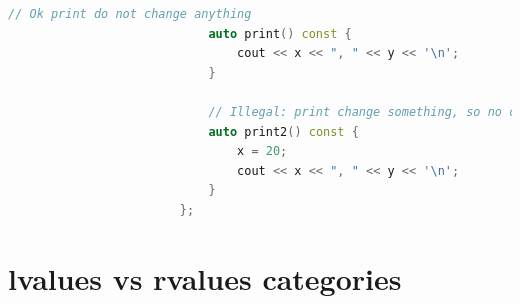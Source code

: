 \documentclass[12pt, fleqn]{report}                             %
\theoremstyle{break}                                            %
\begin{document}
\begin{itemize}
\begin{lstlisting}[language=C++, gobble=24]
                            // Ok print do not change anything
                            auto print() const {                   
                                cout << x << ", " << y << '\n';
                            }

                            // Illegal: print change something, so no const
                            auto print2() const { 
                                x = 20;                  
                                cout << x << ", " << y << '\n';
                            }
                        };
                    \end{lstlisting}

            \end{itemize}
            
            

        \section{lvalues vs rvalues categories}
\end{document}
